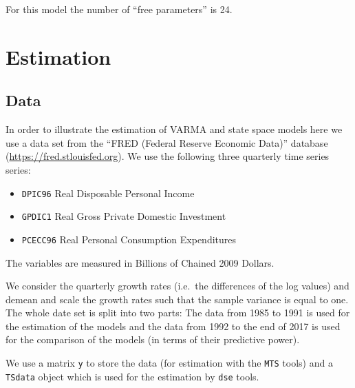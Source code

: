 \documentclass[]{article}
\providecommand{\tightlist}{%
  \setlength{\itemsep}{0pt}\setlength{\parskip}{0pt}}
\begin{document}
For this model the number of ``free parameters'' is 24.

\section{Estimation}\label{estimation}

\subsection{Data}\label{data}

In order to illustrate the estimation of VARMA and state space models
here we use a data set from the ``FRED (Federal Reserve Economic Data)''
database (\url{https://fred.stlouisfed.org}). We use the following three
quarterly time series series:

\begin{itemize}
\tightlist
\item
  \texttt{DPIC96} Real Disposable Personal Income
\item
  \texttt{GPDIC1} Real Gross Private Domestic Investment
\item
  \texttt{PCECC96} Real Personal Consumption Expenditures
\end{itemize}

The variables are measured in Billions of Chained 2009 Dollars.

We consider the quarterly growth rates (i.e.~the differences of the log
values) and demean and scale the growth rates such that the sample
variance is equal to one. The whole date set is split into two parts:
The data from 1985 to 1991 is used for the estimation of the models and
the data from 1992 to the end of 2017 is used for the comparison of the
models (in terms of their predictive power).

We use a matrix \texttt{y} to store the data (for estimation with the
\texttt{MTS} tools) and a \texttt{TSdata} object which is used for the
estimation by \texttt{dse} tools.
\end{document}

